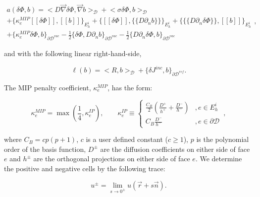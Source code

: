 \documentclass[11pt]{article}
\begin{document}
\begin{equation}
\label{eq::mip_lhs}
\begin{aligned}
a(\delta \Phi, b)  = \Big<  D \vec{\nabla} \delta  \Phi , \vec{\nabla} b \Big>_{\mathcal{D}} + \Big<  \sigma \delta  \Phi , b  \Big>_{\mathcal{D}}    \\
+  \Big\{ \kappa_e^{MIP} [\![ \delta  \Phi ]\!] , [\![  b ]\!]\Big\}_{E_h^i} + \Big\{  [\![  \delta \Phi ]\!] , \{\!\{  D \partial_n b \}\!\}\Big\}_{E_h^i}  + \Big\{ \{\!\{  D \partial_n \delta \Phi \}\!\} , [\![ b ]\!]\Big\}_{E_h^i} \\
+ \Big\{ \kappa_e^{MIP}  \delta \Phi ,   b \Big\}_{\partial \mathcal{D}^{vac}} - \frac{1}{2} \Big\{  \delta \Phi  ,  D \partial_n b \Big\}_{\partial \mathcal{D}^{vac}} - \frac{1}{2} \Big\{   D \partial_n \delta  \Phi , b \Big\}_{\partial \mathcal{D}^{vac}}  
\end{aligned} ,
\end{equation}

\noindent and with the following linear right-hand-side,

\begin{equation}
\label{eq::mip_rhs}
\ell(b) = \Big<  R, b  \Big>_{\mathcal{D}} + \Big\{ \delta  J^{inc}, b \Big\}_{\partial \mathcal{D}^{ref}} .
\end{equation}

\noindent The MIP penalty coefficient, $\kappa_e^{MIP}$, has the form:

\begin{equation}
\label{eq::ip_penalty}
\kappa_e^{MIP} = \max(\frac{1}{4}, \kappa_e^{IP}) , \qquad
\kappa_e^{IP}  \equiv 
		\begin{cases}
		\frac{C_B}{2} \left(  \frac{D^+}{h^+} + \frac{D^-}{h^-}  \right) & , e \in E_h^i \\
		C_B \frac{D^-}{h^-}  & , e \in \partial \mathcal{D}
		\end{cases} \, ,
\end{equation}

\noindent where $C_B=cp(p+1)$, $c$ is a user defined constant ($c \geq 1$), $p$ is the polynomial order of the basis function, $D^{\pm}$ are the diffusion coefficients on either side of face $e$ and $h^{\pm}$ are the orthogonal projections on either side of face $e$. We determine the positive and negative cells by the following trace:

\begin{equation}
\label{eq::mip_trace}
u^{\pm} = \lim_{s \rightarrow 0^{\pm}} u (\vec{r} + s \vec{n}) .
\end{equation}
\end{document}

